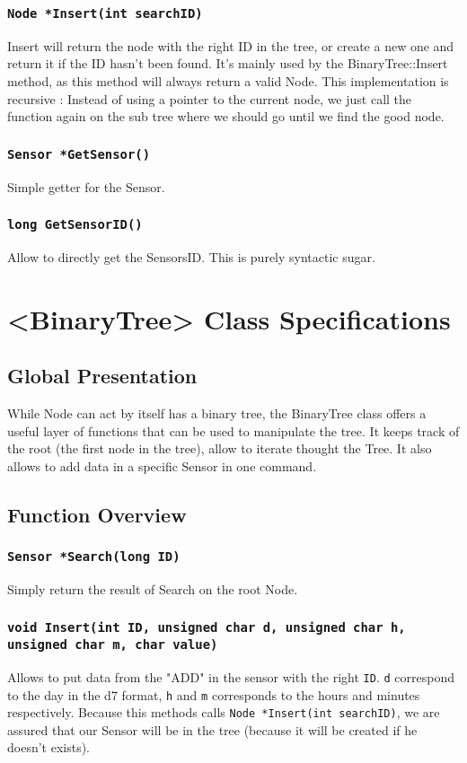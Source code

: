 \documentclass[10pt]{article}
\begin{document}
\subsubsection*{\tt Node *Insert(int searchID)}
Insert will return the node with the right ID in the tree, or create a new one and return it if the ID hasn't been found. It's mainly used by the BinaryTree::Insert method, as this method will always return a valid Node.
This implementation is recursive : Instead of using a pointer to the current node, we just call the function again on the sub tree where we should go until we find the good node.

\subsubsection*{\tt Sensor *GetSensor()}
Simple getter for the Sensor.

\subsubsection*{\tt long GetSensorID()}
Allow to directly get the SensorsID. This is purely syntactic sugar.

\section{<BinaryTree> Class Specifications}
\subsection{Global Presentation}
While Node can act by itself has a binary tree, the BinaryTree class offers a useful layer of functions that can be used to manipulate the tree. It keeps track of the root (the first node in the tree), allow to iterate thought the Tree. It also allows to add data in a specific Sensor in one command.

\subsection{Function Overview}
\subsubsection*{\tt Sensor *Search(long ID)}
Simply return the result of Search on the root Node.

\subsubsection*{\tt void Insert(int ID, 
				unsigned char d,
				unsigned char h,
				unsigned char m,
				char value)}
Allows to put data from the "ADD" in the sensor with the right \texttt{ID}. \texttt d correspond to the day in the d7 format, \texttt h and \texttt m corresponds to the hours and minutes respectively. Because this methods calls {\tt Node *Insert(int searchID)}, we are assured that our Sensor will be in the tree (because it will be created if he doesn't exists).
\end{document}
